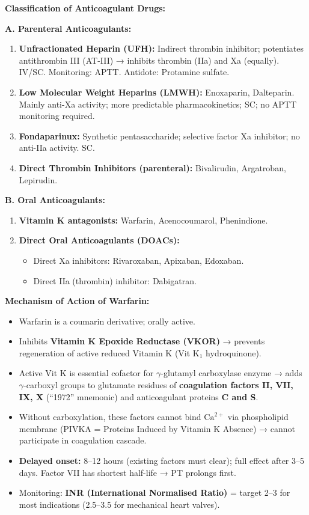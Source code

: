 \documentclass[11pt,a4paper]{article}
\begin{document}
\begin{ansbox}
\textbf{Classification of Anticoagulant Drugs:}

\textbf{A. Parenteral Anticoagulants:}
\begin{enumerate}[leftmargin=*]
    \item \textbf{Unfractionated Heparin (UFH):} Indirect thrombin inhibitor; potentiates antithrombin III (AT-III) → inhibits thrombin (IIa) and Xa (equally). IV/SC. Monitoring: APTT. Antidote: Protamine sulfate.
    \item \textbf{Low Molecular Weight Heparins (LMWH):} Enoxaparin, Dalteparin. Mainly anti-Xa activity; more predictable pharmacokinetics; SC; no APTT monitoring required.
    \item \textbf{Fondaparinux:} Synthetic pentasaccharide; selective factor Xa inhibitor; no anti-IIa activity. SC.
    \item \textbf{Direct Thrombin Inhibitors (parenteral):} Bivalirudin, Argatroban, Lepirudin.
\end{enumerate}

\textbf{B. Oral Anticoagulants:}
\begin{enumerate}[leftmargin=*]
    \item \textbf{Vitamin K antagonists:} Warfarin, Acenocoumarol, Phenindione.
    \item \textbf{Direct Oral Anticoagulants (DOACs):}
    \begin{itemize}
        \item Direct Xa inhibitors: Rivaroxaban, Apixaban, Edoxaban.
        \item Direct IIa (thrombin) inhibitor: Dabigatran.
    \end{itemize}
\end{enumerate}

\textbf{Mechanism of Action of Warfarin:}
\begin{itemize}[leftmargin=*]
    \item Warfarin is a coumarin derivative; orally active.
    \item Inhibits \textbf{Vitamin K Epoxide Reductase (VKOR)} → prevents regeneration of active reduced Vitamin K (Vit K$_1$ hydroquinone).
    \item Active Vit K is essential cofactor for $\gamma$-glutamyl carboxylase enzyme → adds $\gamma$-carboxyl groups to glutamate residues of \textbf{coagulation factors II, VII, IX, X} (``1972'' mnemonic) and anticoagulant proteins \textbf{C and S}.
    \item Without carboxylation, these factors cannot bind $\text{Ca}^{2+}$ via phospholipid membrane (PIVKA = Proteins Induced by Vitamin K Absence) → cannot participate in coagulation cascade.
    \item \textbf{Delayed onset:} 8--12 hours (existing factors must clear); full effect after 3--5 days. Factor VII has shortest half-life → PT prolongs first.
    \item Monitoring: \textbf{INR (International Normalised Ratio)} = target 2--3 for most indications (2.5--3.5 for mechanical heart valves).
\end{itemize}


\end{ansbox}
\end{document}
